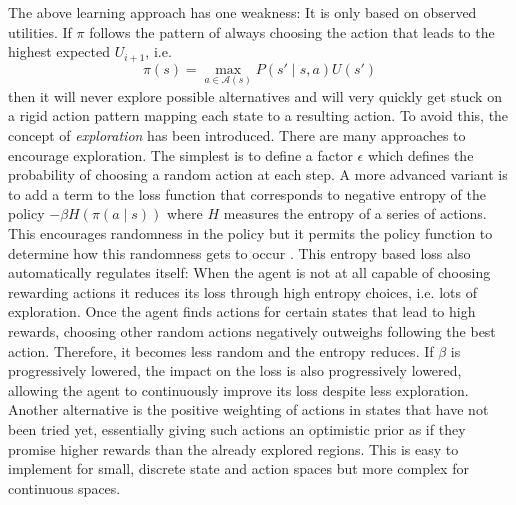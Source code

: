 The above learning approach has one weakness: It is only based on observed utilities. If $\pi$ follows the pattern of
always choosing the action that leads to the highest expected $U_{i+1}$, i.e.
\begin{equation}
\pi(s) = \max_{a \in \mathcal{A}(s)}P(s' \mid s, a)U(s')
\end{equation}
then it will never explore possible alternatives and will very quickly get stuck on a rigid action
pattern mapping each state to a resulting action. To avoid this, the concept of \emph{exploration} has been introduced.
There are many approaches to encourage exploration. The simplest is to define a factor $\epsilon$ which defines the
probability of choosing a random action at each step. 
A more advanced variant is to add a term to the loss function that
corresponds to negative entropy of the policy $-\beta H(\pi(a \mid s ))$ where $H$ measures the entropy of a series of
actions. This encourages randomness in the policy but it permits the policy function to determine how this randomness 
gets to occur \citep{schmitt2018kickstarting}. This entropy based loss also automatically regulates itself: When the
agent is not at all capable of choosing rewarding actions it reduces its loss through high entropy choices, i.e. lots of
exploration. Once the agent finds actions for certain states that lead to high rewards, choosing other random actions
negatively outweighs following the best action. Therefore, it becomes less random and the entropy reduces. If $\beta$ is
progressively lowered, the impact on the loss is also progressively lowered, allowing the agent to continuously improve
its loss despite less exploration. 
Another alternative is the positive weighting of actions in states that have not been tried yet, essentially giving such
actions an optimistic prior as if they promise higher rewards than the already explored regions. This is easy to
implement for small, discrete state and action spaces but more complex for continuous spaces. 



